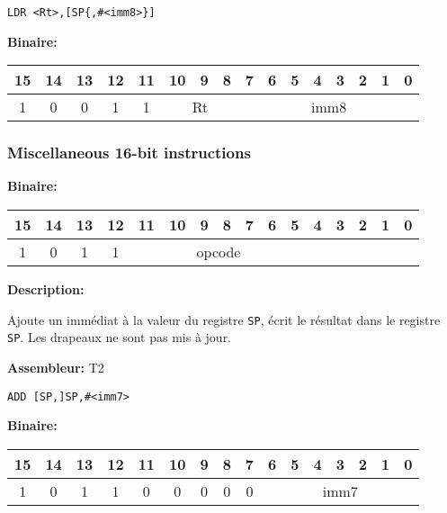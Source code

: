 \documentclass{article}
\begin{document}
    \begin{lstlisting}
LDR <Rt>,[SP{,#<imm8>}]
    \end{lstlisting}

    \textbf{Binaire:}\\

    \begin{tabular}{| c c c c c c c c c c c c c c c c |}
        \hline
        15 & 14 & 13 & 12 & \multicolumn{1}{|c}{11} & \multicolumn{1}{|c}{10} & 9 & 8 & \multicolumn{1}{|c}{7} & 6 & 5 & 4 & 3 & 2 & 1 & 0 \\
        \hline
        1 & 0 & 0 & 1 & \multicolumn{1}{|c}{1} & \multicolumn{3}{|c}{Rt} & \multicolumn{8}{|c|}{imm8} \\
        \hline
    \end{tabular}

    \subsubsection{Miscellaneous 16-bit instructions}
    \label{subsubsec:MiscInstr}

    \textbf{Binaire:}\\

    \begin{tabular}{| c c c c c c c c c c c c c c c c |}
        \hline
        15 & 14 & 13 & 12 & \multicolumn{1}{|c}{11} & 10 & 9 & 8 & 7 & 6 & 5 & \multicolumn{1}{|c}{4} & 3 & 2 & 1 & 0 \\
        \hline
        1 & 0 & 1 & 1 & \multicolumn{7}{|c}{opcode} & \multicolumn{5}{|c|}{} \\
        \hline
    \end{tabular}


    \textbf{Description: }

    Ajoute un immédiat à la valeur du registre \texttt{SP}, écrit le résultat dans le registre \texttt{SP}.
    Les drapeaux ne sont pas mis à jour.

    \textbf{Assembleur:} T2

    \begin{lstlisting}
ADD [SP,]SP,#<imm7>
    \end{lstlisting}

    \textbf{Binaire:}\\

    \begin{tabular}{| c c c c c c c c c c c c c c c c |}
        \hline
        15 & 14 & 13 & 12 & \multicolumn{1}{|c}{11} & 10 & 9 & 8 & \multicolumn{1}{|c}{7} & \multicolumn{1}{|c}{6} & 5 & 4 & 3 & 2 & 1 & 0 \\
        \hline
        1 & 0 & 1 & 1 & \multicolumn{1}{|c}{0} & 0 & 0 & 0 & \multicolumn{1}{|c}{0} & \multicolumn{7}{|c|}{imm7} \\
        \hline
    \end{tabular}
\end{document}
